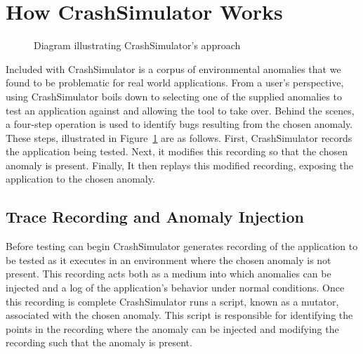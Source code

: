 \section{How CrashSimulator Works}
\label{SEC:approach}

\begin{figure}[t]
  \center{}
  \caption{Diagram illustrating CrashSimulator's approach}
  \label{figure:approach}
\end{figure}

Included with CrashSimulator is a corpus of environmental anomalies
that we found to be problematic for real world
applications.
From a user's perspective, using CrashSimulator boils down to selecting one
of the supplied anomalies to test an application against and allowing the
tool to take over.  Behind the scenes,
a four-step operation is used to identify bugs resulting from
the chosen anomaly.
These steps, illustrated in Figure~\ref{figure:approach} are as follows.
First, CrashSimulator records the application being tested.  Next, it
modifies this recording so that the chosen anomaly is present.
Finally, It then replays this
modified recording, exposing the application to the chosen anomaly.

\subsection{Trace Recording and Anomaly Injection}

Before testing can begin
CrashSimulator generates recording of the application to be
tested as it executes in an environment where the chosen anomaly is not
present.  This recording acts both as a medium into which anomalies can be
injected and a log of the application's behavior under normal
conditions.  Once this recording is complete CrashSimulator runs a script,
known as a mutator, associated with the chosen anomaly.
This script is responsible for identifying
the points in the recording
where the anomaly can be injected and modifying
the recording such that the anomaly is present.

